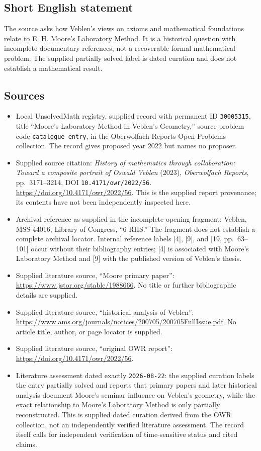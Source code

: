 \documentclass[11pt]{article}
\begin{document}
\subsection{Short English statement}
The source asks how Veblen's views on axioms and mathematical foundations relate to E. H. Moore's Laboratory Method. It is a historical question with incomplete documentary references, not a recoverable formal mathematical problem. The supplied partially solved label is dated curation and does not establish a mathematical result.
\subsection{Sources}
\begin{itemize}
\item Local UnsolvedMath registry, supplied record with permanent ID \texttt{30005315}, title ``Moore's Laboratory Method in Veblen's Geometry,'' source problem code \texttt{catalogue entry}, in the Oberwolfach Reports Open Problems collection. The record gives proposed year 2022 but names no proposer.
\item Supplied source citation: \emph{History of mathematics through collaboration: Toward a composite portrait of Oswald Veblen} (2023), \emph{Oberwolfach Reports}, pp.~3171--3214, DOI \texttt{10.4171/owr/2022/56}. \url{https://doi.org/10.4171/owr/2022/56}. This is the supplied report provenance; its contents have not been independently inspected here.
\item Archival reference as supplied in the incomplete opening fragment: Veblen, MSS 44016, Library of Congress, ``6 RHS.'' The fragment does not establish a complete archival locator. Internal reference labels [4], [9], and [19, pp.~63--101] occur without their bibliography entries; [4] is associated with Moore's Laboratory Method and [9] with the published version of Veblen's thesis.
\item Supplied literature source, ``Moore primary paper'': \url{https://www.jstor.org/stable/1988666}. No title or further bibliographic details are supplied.
\item Supplied literature source, ``historical analysis of Veblen'': \url{https://www.ams.org/journals/notices/200705/200705FullIssue.pdf}. No article title, author, or page locator is supplied.
\item Supplied literature source, ``original OWR report'': \url{https://doi.org/10.4171/owr/2022/56}.
\item Literature assessment dated exactly \texttt{2026-08-22}: the supplied curation labels the entry partially solved and reports that primary papers and later historical analysis document Moore's seminar influence on Veblen's geometry, while the exact relationship to Moore's Laboratory Method is only partially reconstructed. This is supplied dated curation derived from the OWR collection, not an independently verified literature assessment. The record itself calls for independent verification of time-sensitive status and cited claims.
\end{itemize}
\end{document}
